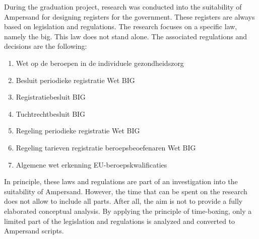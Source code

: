 During the graduation project, research was conducted into the suitability of Ampersand for designing registers for the government.
These registers are always based on legislation and regulations.
The research focuses on a specific law, namely the \acrshort{big}.
\newline
This law does not stand alone.
The associated regulations and decisions are the following:
\begin{enumerate}
    \item Wet op de beroepen in de individuele gezondheidszorg
    \item Besluit periodieke registratie Wet BIG
    \item Registratiebesluit BIG
    \item Tuchtrechtbesluit BIG
    \item Regeling periodieke registratie Wet BIG
    \item Regeling tarieven registratie beroepsbeoefenaren Wet BIG
    \item Algemene wet erkenning EU-beroepskwalificaties
\end{enumerate} 
In principle, these laws and regulations are part of an investigation into the suitability of Ampersand.
However, the time that can be spent on the research does not allow to include all parts.
After all, the aim is not to provide a fully elaborated conceptual analysis.
By applying the principle of time-boxing, only a limited part of the legislation and regulations is analyzed and converted to Ampersand scripts.